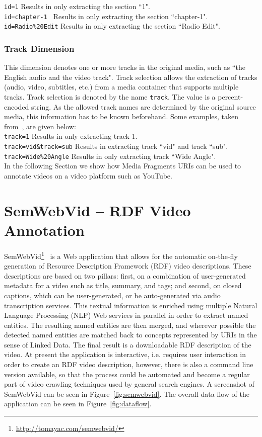 \documentclass[12pt]{article}
\begin{document}
\texttt{id=1} Results in only extracting the section ``1".\\
\indent \texttt{id=chapter-1 } Results in only extracting the section ``chapter-1".\\
\indent \texttt{id=Radio\%20Edit} Results in only extracting the section ``Radio Edit".

\subsubsection{Track Dimension}
This dimension denotes one or more tracks in the original media, such as ``the English audio and the video track". Track selection allows the extraction of tracks (audio, video, subtitles, etc.) from a media container that supports multiple tracks. Track selection is denoted by the name \texttt{track}. The value is a percent-encoded string. As the allowed track names are determined by the original source media, this information has to be known beforehand. Some examples, taken from~\cite{W3C:MediaFrags}, are given below:\\

\texttt{track=1} Results in only extracting track 1.\\
\indent \texttt{track=vid\&track=sub} Results in extracting track ``vid" and track ``sub".\\
\indent \texttt{track=Wide\%20Angle} Results in only extracting track ``Wide Angle".\\

\noindent In the following Section we show how Media Fragments URIs can be used to annotate videos on a video platform such as YouTube.

\section{SemWebVid -- RDF Video Annotation}
SemWebVid\footnote{\url{http://tomayac.com/semwebvid/}}~\cite{semwebvid} is a Web application that allows for the automatic on-the-fly generation of Resource Description Framework (RDF) video descriptions. These descriptions are based on two pillars: first, on a combination of user-generated metadata for a video such as title, summary, and tags; and second, on closed captions, which can be user-generated, or be auto-generated via audio transcription services. This textual information is enriched using multiple Natural Language Processing (NLP) Web services in parallel in order to extract named entities. The resulting named entities are then merged, and wherever possible the detected named entities are matched back to concepts represented by URIs in the sense of Linked Data. The final result is a downloadable RDF description of the video. At present the application is interactive, i.e. requires user interaction in order to create an RDF video description, however, there is also a command line version available, so that the process could be automated and become a regular part of video crawling techniques used by general search engines. A screenshot of SemWebVid can be seen in Figure~\ref{fig:semwebvid}. The overall data flow of the application can be seen in Figure~\ref{fig:dataflow}.
\end{document}
